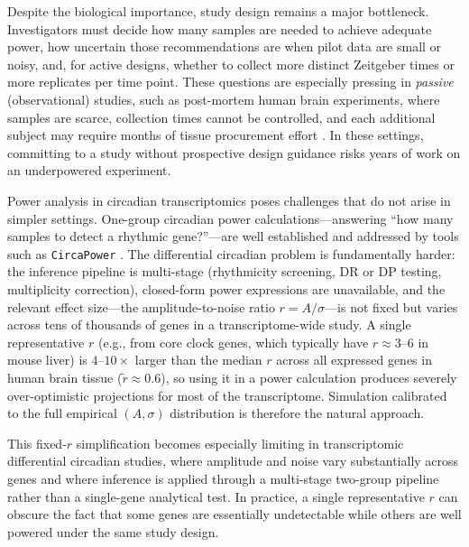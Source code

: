 \documentclass{article}
\newcommand{\software}[1]{\texttt{#1}}
\begin{document}
Despite the biological importance, study design remains a major bottleneck. Investigators must decide how many samples are needed to achieve adequate power, how uncertain those recommendations are when pilot data are small or noisy, and, for active designs, whether to collect more distinct Zeitgeber times or more replicates per time point. These questions are especially pressing in \emph{passive} (observational) studies, such as post-mortem human brain experiments, where samples are scarce, collection times cannot be controlled, and each additional subject may require months of tissue procurement effort \cite{zong2023circapower}. In these settings, committing to a study without prospective design guidance risks years of work on an underpowered experiment.

Power analysis in circadian transcriptomics poses challenges that do not arise in simpler settings. One-group circadian power calculations---answering ``how many samples to detect a rhythmic gene?''---are well established and addressed by tools such as \software{CircaPower} \cite{zong2023circapower}. The differential circadian problem is fundamentally harder: the inference pipeline is multi-stage (rhythmicity screening, DR or DP testing, multiplicity correction), closed-form power expressions are unavailable, and the relevant effect size---the amplitude-to-noise ratio $r=A/\sigma$---is not fixed but varies across tens of thousands of genes in a transcriptome-wide study. A single representative $r$ (e.g., from core clock genes, which typically have $r\approx 3$--$6$ in mouse liver) is $4$--$10\times$ larger than the median $r$ across all expressed genes in human brain tissue ($\tilde{r}\approx 0.6$), so using it in a power calculation produces severely over-optimistic projections for most of the transcriptome. Simulation calibrated to the full empirical $(A,\sigma)$ distribution is therefore the natural approach.

This fixed-$r$ simplification becomes especially limiting in transcriptomic differential circadian studies, where amplitude and noise vary substantially across genes and where inference is applied through a multi-stage two-group pipeline rather than a single-gene analytical test. In practice, a single representative $r$ can obscure the fact that some genes are essentially undetectable while others are well powered under the same study design.
\end{document}
